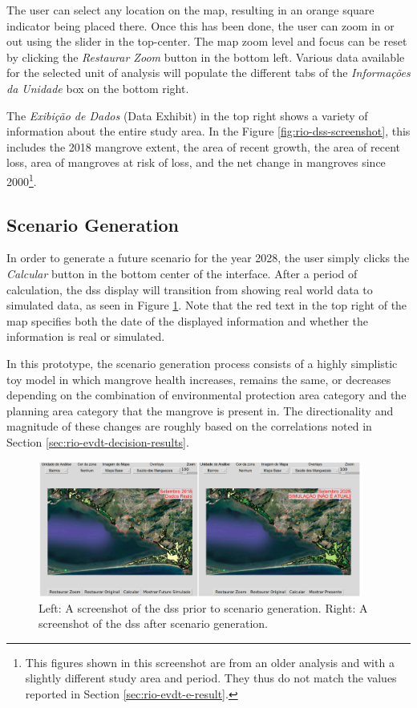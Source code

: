 The user can select any location on the map, resulting in an orange square indicator being placed there. Once this has been done, the user can zoom in or out using the slider in the top-center. The map zoom level and focus can be reset by clicking the \textit{Restaurar Zoom} button in the bottom left. Various data available for the selected unit of analysis will populate the different tabs of the \textit{Informações da Unidade} box on the bottom right. 

The \textit{Exibição de Dados} (Data Exhibit) in the top right shows a variety of information about the entire study area. In the Figure \ref{fig:rio-dss-screenshot}, this includes the 2018 mangrove extent, the area of recent growth, the area of recent loss, area of mangroves at risk of loss, and the net change in mangroves since 2000\footnote{This figures shown in this screenshot are from an older analysis and with a slightly different study area and period. They thus do not match the values reported in Section \ref{sec:rio-evdt-e-result}.}. 

\subsection{Scenario Generation}

In order to generate a future scenario for the year 2028, the user simply clicks the \textit{Calcular} button in the bottom center of the interface. After a period of calculation, the \ac{dss} display will transition from showing real world data to simulated data, as seen in Figure \ref{fig:rio-dss-simulation}. Note that the red text in the top right of the map specifies both the date of the displayed information and whether the information is real or simulated.

In this prototype, the scenario generation process consists of a highly simplistic toy model in which mangrove health increases, remains the same, or decreases depending on the combination of environmental protection area category and the planning area category that the mangrove is present in. The directionality and magnitude of these changes are roughly based on the correlations noted in Section \ref{sec:rio-evdt-decision-results}. 

\begin{figure}[!htb] 
\centering
\includegraphics[width=0.95\textwidth]{Figures/chap4/rio-dss-simulation.png}
\caption[Demonstration of the Rio DSS Scenario Generation]{Left: A screenshot of the \ac{dss} prior to scenario generation. Right: A screenshot of the \ac{dss} after scenario generation.}
\label{fig:rio-dss-simulation}
\end{figure}

